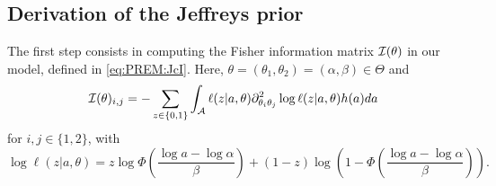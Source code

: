     \subsection{Derivation of the Jeffreys prior}\label{sec:PREM:subsecJeffcalc}



    The first step consists in computing the Fisher information matrix $\mathcal{I}(\theta)$ in our model, defined in \cref{eq:PREM:JcI}. 
    Here, $\theta=(\theta_1,\theta_2)=(\alpha,\beta)\in \Theta$ and 
    \begin{equation}
        \mathcal{I}(\theta)_{i,j}= -\sum_{z \in \{0,1\}} \int_{\mathcal{A} } \ell(z|a,\theta){\partial^2_{\theta_i\theta_j} \log \ell(z|a,\theta)} h(a)da
    \end{equation}
    for $i,j\in\{1,2\}$, with
        \begin{equation}
            \log \ell(z|a,\theta) = z\log\Phi\left(\frac{\log a-\log\alpha}{\beta}\right) + (1-z)\log\left(1-\Phi\left(\frac{\log a-\log\alpha}{\beta}\right)\right).
        \end{equation}
        

